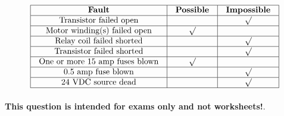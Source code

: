 \eject







$$\vbox{\offinterlineskip
\halign{\strut
\vrule \quad\hfil # \ \hfil & 
\vrule \quad\hfil # \ \hfil & 
\vrule \quad\hfil # \ \hfil \vrule \cr
\noalign{\hrule}
%
{\bf Fault} & {\bf Possible} & {\bf Impossible} \cr
%
\noalign{\hrule}
%
Transistor failed open &  & $\surd$ \cr
%
\noalign{\hrule}
%
Motor winding(s) failed open & $\surd$ &  \cr
%
\noalign{\hrule}
%
Relay coil failed shorted &  & $\surd$ \cr
%
\noalign{\hrule}
%
Transistor failed shorted &  & $\surd$ \cr
%
\noalign{\hrule}
%
One or more 15 amp fuses blown & $\surd$ &  \cr
%
\noalign{\hrule}
%
0.5 amp fuse blown &  & $\surd$ \cr
%
\noalign{\hrule}
%
24 VDC source dead &  & $\surd$ \cr
%
\noalign{\hrule}
} %
}$$ %







{\bf This question is intended for exams only and not worksheets!}.


